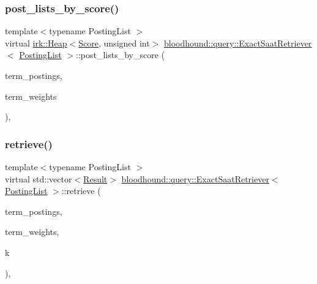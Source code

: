 \subsubsection{\texorpdfstring{post\+\_\+lists\+\_\+by\+\_\+score()}{post\_lists\_by\_score()}}
{\footnotesize\ttfamily template$<$typename Posting\+List $>$ \\
virtual \mbox{\hyperlink{classirk_1_1Heap}{irk\+::\+Heap}}$<$\mbox{\hyperlink{structbloodhound_1_1Score}{Score}}, unsigned int$>$ \mbox{\hyperlink{classbloodhound_1_1query_1_1ExactSaatRetriever}{bloodhound\+::query\+::\+Exact\+Saat\+Retriever}}$<$ \mbox{\hyperlink{classbloodhound_1_1PostingList}{Posting\+List}} $>$\+::post\+\_\+lists\+\_\+by\+\_\+score (\begin{DoxyParamCaption}\item[{const std\+::vector$<$ \mbox{\hyperlink{classbloodhound_1_1PostingList}{Posting\+List}} $>$ \&}]{term\+\_\+postings,  }\item[{const std\+::vector$<$ \mbox{\hyperlink{structbloodhound_1_1Score}{Score}} $>$ \&}]{term\+\_\+weights }\end{DoxyParamCaption})\hspace{0.3cm}{\ttfamily [inline]}, {\ttfamily [virtual]}}

\mbox{\label{classbloodhound_1_1query_1_1ExactSaatRetriever_aced2763cc2a4c12838fef4a20759049e}} 
\subsubsection{\texorpdfstring{retrieve()}{retrieve()}}
{\footnotesize\ttfamily template$<$typename Posting\+List $>$ \\
virtual std\+::vector$<$\mbox{\hyperlink{structbloodhound_1_1query_1_1Result}{Result}}$>$ \mbox{\hyperlink{classbloodhound_1_1query_1_1ExactSaatRetriever}{bloodhound\+::query\+::\+Exact\+Saat\+Retriever}}$<$ \mbox{\hyperlink{classbloodhound_1_1PostingList}{Posting\+List}} $>$\+::retrieve (\begin{DoxyParamCaption}\item[{const std\+::vector$<$ \mbox{\hyperlink{classbloodhound_1_1PostingList}{Posting\+List}} $>$ \&}]{term\+\_\+postings,  }\item[{const std\+::vector$<$ \mbox{\hyperlink{structbloodhound_1_1Score}{Score}} $>$ \&}]{term\+\_\+weights,  }\item[{std\+::size\+\_\+t}]{k }\end{DoxyParamCaption})\hspace{0.3cm}{\ttfamily [inline]}, {\ttfamily [virtual]}}



